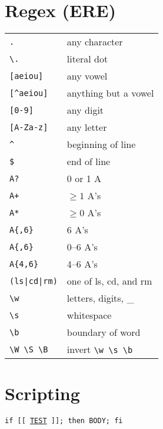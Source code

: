 \documentclass[a4paper, twocolumn]{article}
\renewcommand{\tt}{\texttt}
\begin{document}
\section{Regex (ERE)}
\begin{tabular}{ll}
    \verb|.|            & any character                             \\
    \verb|\.|           & literal dot                               \\
    \verb|[aeiou]|      & any vowel                                 \\
    \verb|[^aeiou]|     & anything but a vowel                      \\
    \verb|[0-9]|        & any digit                                 \\
    \verb|[A-Za-z]|     & any letter                                \\
    \verb|^|            & beginning of line                         \\
    \verb|$|            & end of line                               \\
    \verb|A?|           & 0 or 1 A                                  \\
    \verb|A+|           & $\ge 1$ A's                               \\
    \verb|A*|           & $\ge 0$ A's                               \\
    \verb|A{,6}|        & 6 A's                                     \\
    \verb|A{,6}|        & 0--6 A's                                  \\
    \verb|A{4,6}|       & 4--6 A's                                  \\
    \verb!(ls|cd|rm)!   & one of ls, cd, and rm                     \\
    \verb|\w|           & letters, digits, \_                       \\
    \verb|\s|           & whitespace                                \\
    \verb|\b|           & boundary of word                          \\
    \verb|\W \S \B|     & invert \verb|\w \s \b|
\end{tabular}


\section{Scripting}
\tt{if [[ \underline{TEST} ]]; then BODY; fi}
\vspace{0.3cm}
\end{document}
